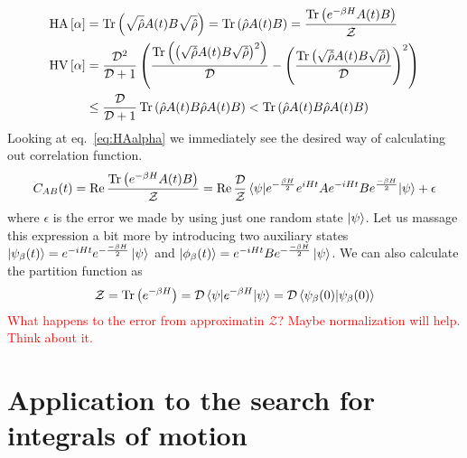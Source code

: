 \begin{align}
	\mathrm{HA}\left[\alpha\right] &= \Tr\left(\sqrt{\hat{\rho}}A(t)B\sqrt{\hat{\rho}}\right) = \Tr\left(\hat{\rho}A(t)B\right) = \frac{\Tr\left(e^{-\beta H}A(t)B\right)}{\mathcal{Z}} \label{eq:HAalpha}\\
	\mathrm{HV}\left[\alpha\right] &= \frac{\mathcal{D}^2}{\mathcal{D} + 1}\left(
		\frac{\Tr\left(\left(\sqrt{\hat{\rho}}A(t)B\sqrt{\hat{\rho}}\right)^2\right)}{\mathcal{D}} - \left(\frac{\Tr\left(\sqrt{\hat{\rho}}A(t)B\sqrt{\hat{\rho}}\right)}{\mathcal{D}}\right)^2
	\right) \nonumber\\
	&\leq \frac{\mathcal{D}}{\mathcal{D}+1} \Tr\left(\hat{\rho}A(t)B \hat{\rho}A(t)B\right) < \Tr\left(\hat{\rho}A(t)B \hat{\rho}A(t)B\right)
	\label{eq:HValpha}
\end{align}
Looking at eq.~\eqref{eq:HAalpha} we immediately see the desired way of calculating out correlation function.
\begin{equation}
	C_{AB}(t) = \Re \frac{\Tr\left(e^{-\beta H}A(t)B\right)}{\mathcal{Z}} = \Re \frac{\dimension}{\mathcal{Z}} 
	\matrixel{\psi}{e^{-\frac{\beta H}{2}} e^{i H t}A e^{-i H t} Be^{\frac{-\beta H}{2}}}{\psi} + \epsilon
\end{equation}
where \(\epsilon\) is the error we made by using just one random state \(\ket{\psi}\). 
Let us massage this expression a bit more by introducing two auxiliary states 
\(\ket{\psi_{\beta}(t)} = e^{-i H t} e^{-\frac{-\beta H}{2}} \ket{\psi} \) and
\(\ket{\phi_{\beta}(t)} = e^{-i H t} B e^{-\frac{-\beta H}{2}} \ket{\psi} \). We can also
calculate the partition function as
\begin{equation}
	\mathcal{Z} = \Tr\left(e^{-\beta H}\right) = \dimension \matrixel{\psi}{e^{-\beta H}}{\psi} = 
	\dimension \braket{\psi_{\beta}(0)}{\psi_{\beta}(0)}
\end{equation}
\textcolor{red}{What happens to the error from approximatin \(\mathcal{Z}\)? Maybe normalization will help.
Think about it.}

\section{Application to the search for integrals of motion}


